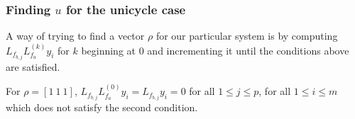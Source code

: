 \documentclass[letterpaper, 10 pt, conference]{ieeeconf}  %
\begin{document}
\subsubsection{Finding $u$ for the unicycle case}

\mbox{}





A way of trying to find a vector $\rho$ for our particular system is by computing $L_{f_{b,j}}L_{f_a}^{(k)}y_i$ for $k$ beginning at $0$ and incrementing it until the conditions above are satisfied.

For ${\rho = [1\ 1\ 1]}$, ${L_{f_{b,j}}L_{f_a}^{(0)}y_i = L_{f_{b,j}}y_i = 0}$ for all ${1 \leq j \leq p}$, for all ${1 \leq i \leq m}$ which does not satisfy the second condition.

%
\end{document}
